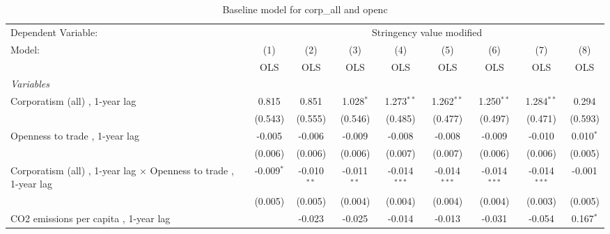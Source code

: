 
\begin{table}[htbp]
   \caption{Baseline model for corp\_all and openc}
   \centering
   \begin{tabular}{lcccccccc}
      \toprule
      Dependent Variable: & \multicolumn{8}{c}{Stringency value modified}\\
      Model:                                                                  & (1)          & (2)           & (3)           & (4)            & (5)            & (6)            & (7)            & (8)\\  
                                                                              &  OLS         & OLS           & OLS           & OLS            & OLS            & OLS            & OLS            & OLS\\  
      \midrule
      \emph{Variables}\\
      Corporatism (all) , 1-year lag                                          & 0.815        & 0.851         & 1.028$^{*}$   & 1.273$^{**}$   & 1.262$^{**}$   & 1.250$^{**}$   & 1.284$^{**}$   & 0.294\\   
                                                                              & (0.543)      & (0.555)       & (0.546)       & (0.485)        & (0.477)        & (0.497)        & (0.471)        & (0.593)\\   
      Openness to trade , 1-year lag                                          & -0.005       & -0.006        & -0.009        & -0.008         & -0.008         & -0.009         & -0.010         & 0.010$^{*}$\\   
                                                                              & (0.006)      & (0.006)       & (0.006)       & (0.007)        & (0.007)        & (0.006)        & (0.006)        & (0.005)\\   
      Corporatism (all) , 1-year lag $\times$ Openness to trade , 1-year lag  & -0.009$^{*}$ & -0.010$^{**}$ & -0.011$^{**}$ & -0.014$^{***}$ & -0.014$^{***}$ & -0.014$^{***}$ & -0.014$^{***}$ & -0.001\\   
                                                                              & (0.005)      & (0.005)       & (0.004)       & (0.004)        & (0.004)        & (0.004)        & (0.003)        & (0.005)\\   
      CO2 emissions per capita , 1-year lag                                   &              & -0.023        & -0.025        & -0.014         & -0.013         & -0.031         & -0.054         & 0.167$^{*}$\\   

\end{tabular}
\end{table}
